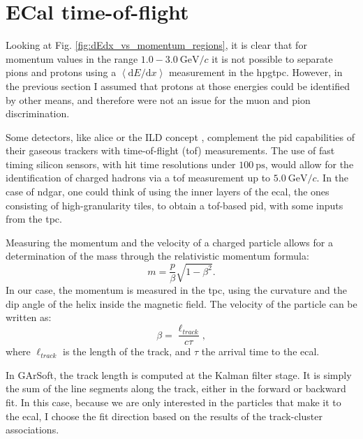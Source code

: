 \section{ECal time-of-flight}\label{section:tof}

Looking at Fig. \ref{fig:dEdx_vs_momentum_regions}, it is clear that for momentum values in the range $1.0-3.0 ~ \mathrm{GeV}/c$ it is not possible to separate pions and protons using a $\left<\mathrm{d}E/\mathrm{d}x\right>$ measurement in the \gls{hpgtpc}. However, in the previous section I assumed that protons at those energies could be identified by other means, and therefore were not an issue for the muon and pion discrimination.

Some detectors, like \gls{alice} \cite{ALICE2011} or the ILD concept \cite{Einhaus2021}, complement the \gls{pid} capabilities of their gaseous trackers with time-of-flight (\gls{tof}) measurements. The use of fast timing silicon sensors, with hit time resolutions under $100~\mathrm{ps}$, would allow for the identification of charged hadrons via a \gls{tof} measurement up to $5.0 ~ \mathrm{GeV}/c$. In the case of \gls{ndgar}, one could think of using the inner layers of the \gls{ecal}, the ones consisting of high-granularity tiles, to obtain a \gls{tof}-based \gls{pid}, with some inputs from the \gls{tpc}.

Measuring the momentum and the velocity of a charged particle allows for a determination of the mass through the relativistic momentum formula:
\begin{equation}\label{8.19}
	m = \frac{p}{\beta} \sqrt{1-\beta^{2}}.
\end{equation}
In our case, the momentum is measured in the \gls{tpc}, using the curvature and the dip angle of the helix inside the magnetic field. The velocity of the particle can be written as:
\begin{equation}
	\beta = \frac{\ell_{track}}{c \tau},
\end{equation}
where $\ell_{track}$ is the length of the track, and $\tau$ the arrival time to the \gls{ecal}.

In GArSoft, the track length is computed at the Kalman filter stage. It is simply the sum of the line segments along the track, either in the forward or backward fit. In this case, because we are only interested in the particles that make it to the \gls{ecal}, I choose the fit direction based on the results of the track-cluster associations.

